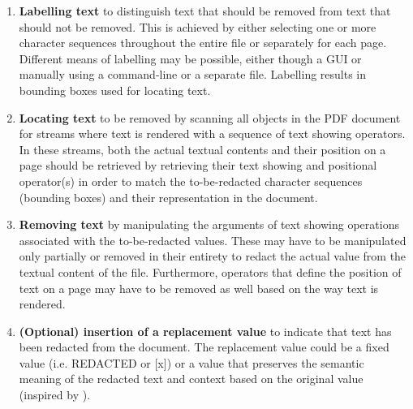 \begin{enumerate}
    \item \textbf{Labelling text} to distinguish text that should be removed from text that should not be removed. This is achieved by either selecting one or more character sequences throughout the entire file or separately for each page. Different means of labelling may be possible, either though a GUI or manually using a command-line or a separate file. Labelling results in bounding boxes used for locating text.
    
    \item \textbf{Locating text} to be removed by scanning all objects in the PDF document for streams where text is rendered with a sequence of text showing operators. In these streams, both the actual textual contents and their position on a page should be retrieved by retrieving their text showing and positional operator(s) in order to match the to-be-redacted character sequences (bounding boxes) and their representation in the document. 
    
    \item \textbf{Removing text} by manipulating the arguments of text showing operations associated with the to-be-redacted values. These may have to be manipulated only partially or removed in their entirety to redact the actual value from the textual content of the file. Furthermore, operators that define the position of text on a page may have to be removed as well based on the way text is rendered.
    
    \item \textbf{(Optional) insertion of a replacement value} to indicate that text has been redacted from the document. The replacement value could be a fixed value (i.e. REDACTED or [x]) or a value that preserves the semantic meaning of the redacted text and context based on the original value (inspired by \cite{olstad2023generation}). 
    

\end{enumerate}
